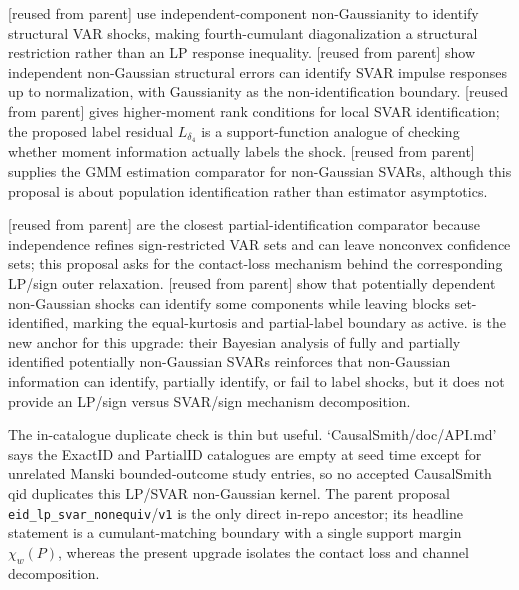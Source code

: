 \documentclass[11pt]{article}
\theoremstyle{definition}
\theoremstyle{plain}
\theoremstyle{remark}
\begin{document}
\citet{GourierouxMonfortRenne2017} [reused from parent] use independent-component non-Gaussianity to identify structural VAR shocks, making fourth-cumulant diagonalization a structural restriction rather than an LP response inequality.  \citet[pp.~288--304]{LanneMeitzSaikkonen2017} [reused from parent] show independent non-Gaussian structural errors can identify SVAR impulse responses up to normalization, with Gaussianity as the non-identification boundary.  \citet[pp.~27--46]{Guay2021} [reused from parent] gives higher-moment rank conditions for local SVAR identification; the proposed label residual \(L_{\delta_4}\) is a support-function analogue of checking whether moment information actually labels the shock.  \citet{LanneLuoto2021} [reused from parent] supplies the GMM estimation comparator for non-Gaussian SVARs, although this proposal is about population identification rather than estimator asymptotics.

\citet[pp.~1827--1847]{DrautzburgWright2023} [reused from parent] are the closest partial-identification comparator because independence refines sign-restricted VAR sets and can leave nonconvex confidence sets; this proposal asks for the contact-loss mechanism behind the corresponding LP/sign outer relaxation.  \citet{LanneLiuLuoto2026} [reused from parent] show that potentially dependent non-Gaussian shocks can identify some components while leaving blocks set-identified, marking the equal-kurtosis and partial-label boundary as active.  \citet[abstract and pp.~1--3]{AnttonenLanneLuoto2024} is the new anchor for this upgrade: their Bayesian analysis of fully and partially identified potentially non-Gaussian SVARs reinforces that non-Gaussian information can identify, partially identify, or fail to label shocks, but it does not provide an LP/sign versus SVAR/sign mechanism decomposition.

The in-catalogue duplicate check is thin but useful.  `CausalSmith/doc/API.md' says the ExactID and PartialID catalogues are empty at seed time except for unrelated Manski bounded-outcome study entries, so no accepted CausalSmith qid duplicates this LP/SVAR non-Gaussian kernel.  The parent proposal \texttt{eid\_lp\_svar\_nonequiv}/\texttt{v1} is the only direct in-repo ancestor; its headline statement is a cumulant-matching boundary with a single support margin \(\chi_w(P)\), whereas the present upgrade isolates the contact loss and channel decomposition.
\end{document}
